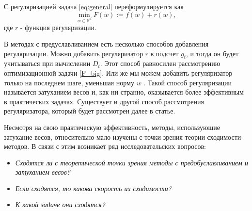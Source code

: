 С регуляризацией задача \eqref{eq:general} переформулируется как
\begin{equation} \label{F_big}
	\min_{w \in \mathbb{R}^d} F(w) := f(w) + r(w),
\end{equation}
где $r$ - функция регуляризации.

В методах с предуславливанием есть несколько способов добавления регуляризации.
Можно добавить регуляризатор $r$ в подсчет $g_t$, и тогда он будет учитываться при вычислении $D_t$. Этот способ равносилен рассмотрению оптимизационной задачи \eqref{F_big}.
Или же мы можем добавить регуляризатор только на последнем шаге, уменьшая норму $w$ \citep{loshchilov2017decoupled}.
Такой способ регуляризации называется затуханием весов и, как ни странно, оказывается более эффективным в практических задачах.
Существует и другой способ рассмотрения регуляризатора, который будет рассмотрен далее в статье.

Несмотря на свою практическую эффективность, методы, использующие затухание весов, относительно мало изучены с точки зрения теории сходимости методов.
В связи с этим возникает ряд исследовательских вопросов:
\begin{itemize}
    \item \textit{Сходятся ли с теоретической точки зрения методы с предобуславливанием и затуханием весов?}
    \item \textit{Если сходятся, то какова скорость их сходимости?}
    \item \textit{К какой задаче они сходятся?}
\end{itemize}
